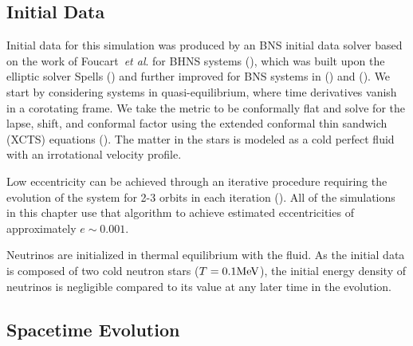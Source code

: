 
\subsection{Initial Data}

Initial data for this simulation was produced by an BNS initial data solver based on the work of Foucart~{\it et
al}. for BHNS systems (\citet*{foucart2008initial}), which was built upon the elliptic solver Spells (\citet*{pfeiffer2003}) and further improved for BNS systems in (\citet*{tacik2015binary}) and (\citet*{haas:2016}). We start by considering systems in quasi-equilibrium, where time
derivatives vanish in a corotating frame. We take the metric to be conformally flat and solve for the lapse,
shift, and conformal factor using the extended conformal thin sandwich (XCTS) equations (\citet*{pfeiffer2003b}). The matter in the stars is modeled as a cold perfect fluid with an irrotational velocity profile.

Low eccentricity can be achieved through an iterative procedure requiring the evolution of the system for 2-3 orbits in each iteration (\citet*{pfeiffer2007reducing}). All of the simulations in this chapter use that algorithm to achieve estimated eccentricities of approximately $e\sim 0.001$.

Neutrinos are initialized in thermal equilibrium with the fluid. As the initial data is composed of two cold neutron stars ($T=0.1{\rm MeV}$), the initial energy density of neutrinos is negligible compared to its value at any later time in the evolution.


\subsection{Spacetime Evolution}


